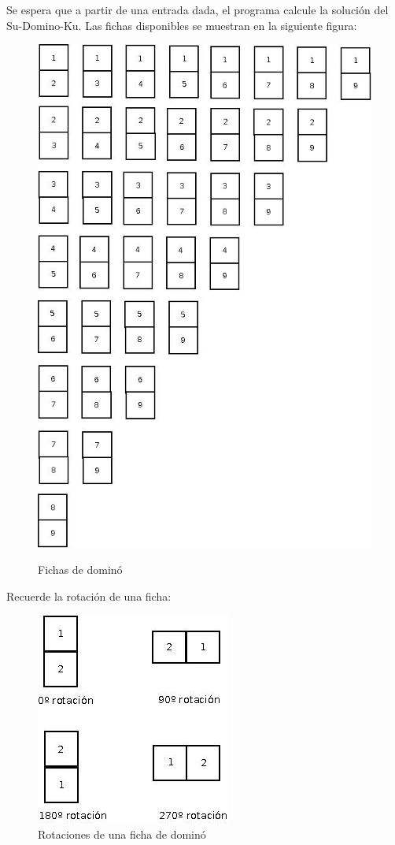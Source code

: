 \documentclass[twocolumn]{article}
\begin{document}
Se espera que a partir de una entrada dada, el programa calcule la solución del Su-Domino-Ku. Las fichas disponibles se muestran en la siguiente figura:

\begin{figure}[H]
	\centering
	\includegraphics[scale=0.45]{domino-set.jpg}
	\label{fig:fichasDomino}
	\caption{Fichas de dominó}
\end{figure}

Recuerde la rotación de una ficha:

\begin{figure}[H]
	\centering
	\includegraphics[scale=0.6]{Rotaciones.jpeg}
	\caption{Rotaciones de una ficha de dominó}
	\label{fig:dominoRotacion}
\end{figure}
\end{document}
